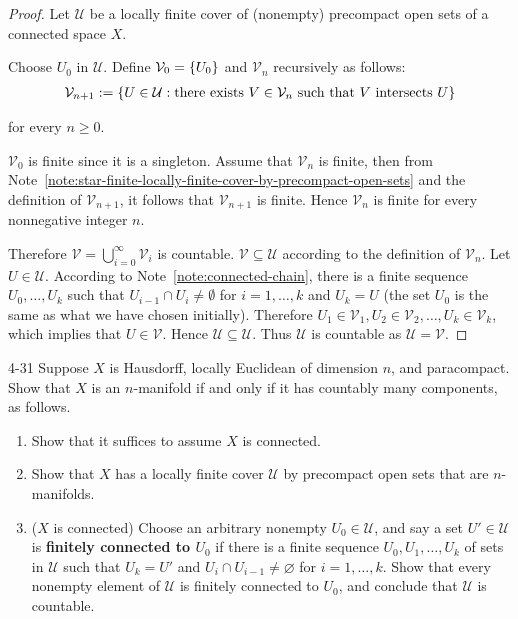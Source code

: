\begin{proof}
	Let $\mathcal{U}$ be a locally finite cover of (nonempty) precompact open sets of a connected space $X$.

	Choose $U_{0}$ in $\mathcal{U}$. Define $\mathcal{V}_{0} = \left\{{ U_{0} }\right\}$ and $\mathcal{V}_{n}$ recursively as follows:
	\begin{align*}
		\mathcal{V}_{n+1} := \left\{{ U\in\mathcal{U}: \text{there exists $V \in \mathcal{V}_{n}$ such that $V$ intersects $U$} }\right\}
	\end{align*}

	for every $n\geq 0$.

	$\mathcal{V}_{0}$ is finite since it is a singleton. Assume that $\mathcal{V}_{n}$ is finite, then from Note~\ref{note:star-finite-locally-finite-cover-by-precompact-open-sets} and the definition of $\mathcal{V}_{n+1}$, it follows that $\mathcal{V}_{n+1}$ is finite. Hence $\mathcal{V}_{n}$ is finite for every nonnegative integer $n$.

	Therefore $\mathcal{V} = \bigcup^{\infty}_{i=0}\mathcal{V}_{i}$ is countable. $\mathcal{V} \subseteq \mathcal{U}$ according to the definition of $\mathcal{V}_{n}$. Let $U\in \mathcal{U}$. According to Note~\ref{note:connected-chain}, there is a finite sequence $U_{0}, \ldots, U_{k}$ such that $U_{i-1}\cap U_{i}\ne \emptyset$ for $i = 1, \ldots, k$ and $U_{k} = U$ (the set $U_{0}$ is the same as what we have chosen initially). Therefore $U_{1} \in \mathcal{V}_{1}, U_{2} \in \mathcal{V}_{2}, \ldots, U_{k} \in \mathcal{V}_{k}$, which implies that $U\in \mathcal{V}$. Hence $\mathcal{U} \subseteq \mathcal{U}$. Thus $\mathcal{U}$ is countable as $\mathcal{U} = \mathcal{V}$.
\end{proof}

\begin{problem}{4-31}
Suppose $X$ is Hausdorff, locally Euclidean of dimension $n$, and paracompact. Show that $X$ is an $n$-manifold if and only if it has countably many components, as follows.
\begin{enumerate}[label={(\alph*)},itemsep=0pt]
	\item Show that it suffices to assume $X$ is connected.
	\item Show that $X$ has a locally finite cover $\mathscr{U}$ by precompact open sets that are $n$-manifolds.
	\item ($X$ is connected) Choose an arbitrary nonempty $U_{0} \in \mathscr{U}$, and say a set $U' \in \mathscr{U}$ is \textbf{finitely connected to $U_{0}$} if there is a finite sequence $U_{0}, U_{1}, \ldots, U_{k}$ of sets in $\mathscr{U}$ such that $U_{k} = U'$ and $U_{i} \cap U_{i-1} \ne \varnothing$ for $i = 1, \ldots, k$. Show that every nonempty element of $\mathscr{U}$ is finitely connected to $U_{0}$, and conclude that $\mathscr{U}$ is countable.
\end{enumerate}
\end{problem}

